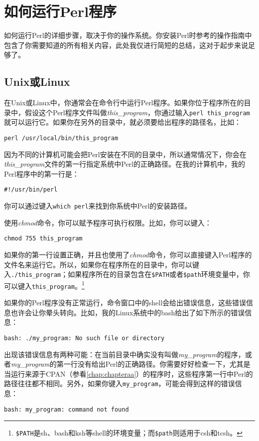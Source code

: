 \section{如何运行Perl程序}
如何运行Perl的详细步骤，取决于你的操作系统。你安装Perl时参考的操作指南中包含了你需要知道的所有相关内容，此处我仅进行简短的总结，这对于起步来说足够了。

\subsection{Unix或Linux}
在Unix或Linux中，你通常会在命令行中运行Perl程序。如果你位于程序所在的目录中，假设这个Perl程序文件叫做\textit{this\_program}，你通过输入\verb|perl this_program|就可以运行它。如果你在另外的目录中，就必须要给出程序的路径名，比如：

\noindent
\verb|perl /usr/local/bin/this_program|

因为不同的计算机可能会把Perl安装在不同的目录中，所以通常情况下，你会在\textit{this\_program}文件的第一行指定系统中Perl的正确路径。在我的计算机中，我的Perl程序中的第一行是：

\noindent
\verb|#!/usr/bin/perl|

你可以通过键入\verb|which perl|来找到你系统中Perl的安装路径。

使用\textit{chmod}命令，你可以赋予程序可执行权限。比如，你可以键入：

\noindent
\verb|chmod 755 this_program|

如果你的第一行设置正确，并且也使用了\textit{chmod}命令，你可以直接键入Perl程序的文件名来运行它。所以，如果你在程序所在的目录中，你可以键入\verb|./this_program|；如果程序所在的目录包含在\verb|$PATH|或者\verb|$path|环境变量中，你可以键入\verb|this_program|。\footnote{\verb|$PATH|是sh、bash和ksh等shell的环境变量；而\verb|$path|则适用于csh和tcsh。}

如果你的Perl程序没有正常运行，命令窗口中的shell会给出错误信息，这些错误信息也许会让你晕头转向。比如，我的Linux系统中的bash给出了如下所示的错误信息：

\noindent
\verb|bash: ./my_program: No such file or directory|

出现该错误信息有两种可能：在当前目录中确实没有叫做\textit{my\_program}的程序，或者\textit{my\_program}的第一行没有给出Perl的正确路径。你需要好好检查一下，尤其是当运行来源于CPAN（参看\autoref{chap:chapteraa}）的程序时，这些程序第一行中Perl的路径往往都不相同。另外，如果你键入\verb|my_program|，可能会得到这样的错误信息：

\noindent
\verb|bash: my_program: command not found|

